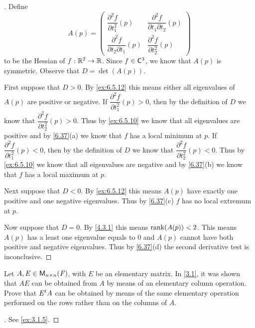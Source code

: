 \begin{proof}[]
  Define
  \[
    A(p) = \begin{pmatrix}
      \dfrac{\partial^2 f}{\partial t_1^2}(p)            & \dfrac{\partial^2 f}{\partial t_1 \partial t_2}(p) \\
      \dfrac{\partial^2 f}{\partial t_2 \partial t_1}(p) & \dfrac{\partial^2 f}{\partial t_2^2}(p)
    \end{pmatrix}
  \]
  to be the Hessian of \(f : \mathbb{R}^2 \to \mathbb{R}\).
  Since \(f \in \cfs[3]\), we know that \(A(p)\) is symmetric.
  Observe that \(D = \det(A(p))\).

  First suppose that \(D > 0\).
  By \cref{ex:6.5.12} this means either all eigenvalues of \(A(p)\) are positive or negative.
  If \(\dfrac{\partial^2 f}{\partial t_1^2}(p) > 0\), then by the definition of \(D\) we know that \(\dfrac{\partial^2 f}{\partial t_2^2}(p) > 0\).
  Thus by \cref{ex:6.5.10} we know that all eigenvalues are positive and by \cref{6.37}(a) we know that \(f\) has a local minimum at \(p\).
  If \(\dfrac{\partial^2 f}{\partial t_1^2}(p) < 0\), then by the definition of \(D\) we know that \(\dfrac{\partial^2 f}{\partial t_2^2}(p) < 0\).
  Thus by \cref{ex:6.5.10} we know that all eigenvalues are negative and by \cref{6.37}(b) we know that \(f\) has a local maximum at \(p\).

  Next suppose that \(D < 0\).
  By \cref{ex:6.5.12} this means \(A(p)\) have exactly one positive and one negative eigenvalues.
  Thus by \cref{6.37}(c) \(f\) has no local extremum at \(p\).

  Now suppose that \(D = 0\).
  By \cref{4.3.1} this means \(\rk{A(p)} < 2\).
  This means \(A(p)\) has a least one eigenvalue equals to \(0\) and \(A(p)\) cannot have both positive and negative eigenvalues.
  Thus by \cref{6.37}(d) the second derivative test is inconclusive.
\end{proof}

\begin{ex}\label{ex:6.8.21}
  Let \(A, E \in \ms[n][n][\F]\), with \(E\) be an elementary matrix.
  In \cref{3.1}, it was shown that \(AE\) can be obtained from \(A\) by means of an elementary column operation.
  Prove that \({E}^{t} A\) can be obtained by means of the same elementary operation performed on the rows rather than on the columns of \(A\).
\end{ex}

\begin{proof}[]
  See \cref{ex:3.1.5}.
\end{proof}

